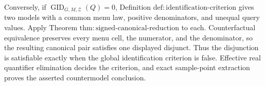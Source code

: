 Conversely, if \(\operatorname{GID}_{G,M,\mathcal Z}(Q)=0\), Definition \(\mathrm{def:identification\text{-}criterion}\) gives two models with a common menu law, positive denominators, and unequal query values.  Apply Theorem \(\mathrm{thm:signed\text{-}canonical\text{-}reduction}\) to each.  Counterfactual equivalence preserves every menu cell, the numerator, and the denominator, so the resulting canonical pair satisfies one displayed disjunct.  Thus the disjunction is satisfiable exactly when the global identification criterion is false.  Effective real quantifier elimination decides the criterion, and exact sample-point extraction proves the asserted countermodel conclusion.